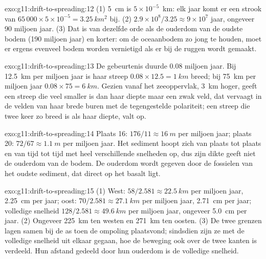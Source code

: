 \begin{solution}{exo:g11:drift-to-spreading:12}
(1) \qty{5}{cm} is $5 \times 10^{-5}$~\unit{km}: elk jaar komt er een strook van
$65\,000 \times 5 \times 10^{-5} = \qty{3.25}{km^2}$ bij.
(2) $2.9 \times 10^8/3.25 \approx 9 \times 10^7$ jaar, ongeveer 90 miljoen
jaar. (3) Dat is van dezelfde orde als de ouderdom van de oudste bodem
(190 miljoen jaar) en korter: om de oceaanbodem zo jong te houden, moet er ergens
evenveel bodem worden vernietigd als er bij de ruggen wordt gemaakt.
\end{solution}

\begin{solution}{exo:g11:drift-to-spreading:13}
De gebeurtenis duurde \num{0.08} miljoen jaar. Bij \qty{12.5}{km} per miljoen
jaar is haar streep $0.08 \times 12.5 = \qty{1}{km}$ breed; bij \qty{75}{km} per
miljoen jaar $0.08 \times 75 = \qty{6}{km}$. Gezien vanaf het zeeoppervlak,
\qty{3}{km} hoger, geeft een streep die veel smaller is dan haar diepte maar een
zwak veld, dat vervaagt in de velden van haar brede buren met de tegengestelde
polariteit; een streep die twee keer zo breed is als haar diepte, valt op.
\end{solution}

\begin{solution}{exo:g11:drift-to-spreading:14}
Plaats 16: $176/11 \approx \qty{16}{m}$ per miljoen jaar; plaats 20: $72/67
\approx \qty{1.1}{m}$ per miljoen jaar. Het sediment hoopt zich van plaats tot
plaats en van tijd tot tijd met heel verschillende snelheden op, dus zijn dikte
geeft niet de ouderdom van de bodem. De ouderdom wordt gegeven door de fossielen
van het oudste sediment, dat direct op het basalt ligt.
\end{solution}

\begin{solution}{exo:g11:drift-to-spreading:15}
(1) West: $58/2.581 \approx \qty{22.5}{km}$ per miljoen jaar,
\qty{2.25}{cm} per jaar; oost: $70/2.581 \approx \qty{27.1}{km}$ per miljoen
jaar, \qty{2.71}{cm} per jaar; volledige snelheid $128/2.581 \approx \qty{49.6}{km}$ per
miljoen jaar, ongeveer \qty{5.0}{cm} per jaar. (2) Ongeveer \qty{225}{km} ten
westen en \qty{271}{km} ten oosten. (3) De twee grenzen lagen samen bij de as
toen de ompoling plaatsvond; sindsdien zijn ze met de volledige snelheid uit
elkaar gegaan, hoe de beweging ook over de twee kanten is verdeeld. Hun afstand
gedeeld door hun ouderdom is de volledige snelheid.
\end{solution}

